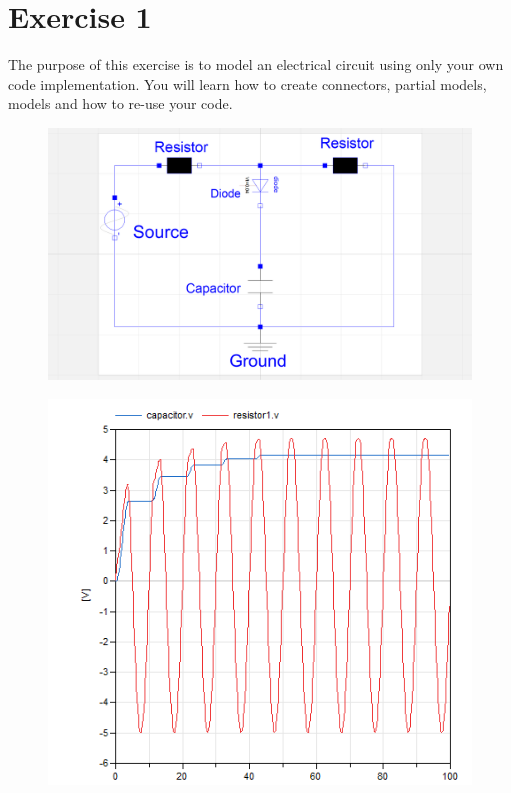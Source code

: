 \documentclass[10pt,a4paper]{article}
\author{Damien Picard}
\begin{document}
\section*{Exercise 1}
The purpose of this exercise is to model an electrical circuit using only your own code implementation. You will learn how to create connectors, partial models, models and how to re-use your code.

\begin{figure}[h]
\centering
\begin{minipage}{.5\textwidth}
  \centering
  \includegraphics[width=1\linewidth]{Figures/circuit.png}
  \label{fig:cir}
\end{minipage}%
\begin{minipage}{.5\textwidth}
  \centering
  \includegraphics[width=.8\linewidth]{Figures/result.png}
  \label{fig:res}
\end{minipage}
\end{figure}
\end{document}

